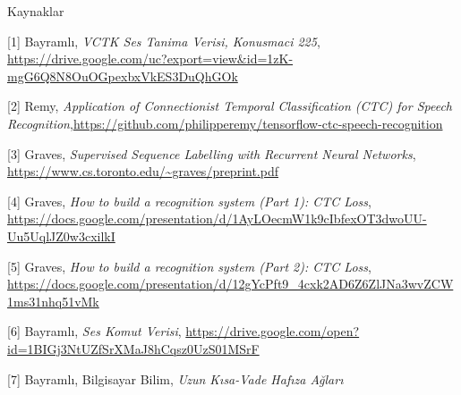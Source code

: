 \documentclass[12pt,fleqn]{article}\usepackage{../../common}
\begin{document}
\inputminted[fontsize=\footnotesize]{python}{train_ctc.py}

Kaynaklar

[1] Bayramlı, {\em VCTK Ses Tanima Verisi, Konusmaci 225}, \url{https://drive.google.com/uc?export=view&id=1zK-mgG6Q8N8OuOGpexbxVkES3DuQhGOk}

[2] Remy, {\em Application of Connectionist Temporal Classification (CTC) for Speech Recognition},\url{https://github.com/philipperemy/tensorflow-ctc-speech-recognition}

[3] Graves, {\em Supervised Sequence Labelling with Recurrent Neural Networks}, \url{https://www.cs.toronto.edu/~graves/preprint.pdf}

[4] Graves, {\em How to build a recognition system (Part 1): CTC Loss}, \url{https://docs.google.com/presentation/d/1AyLOecmW1k9cIbfexOT3dwoUU-Uu5UqlJZ0w3cxilkI}

[5] Graves, {\em How to build a recognition system (Part 2): CTC Loss}, \url{https://docs.google.com/presentation/d/12gYcPft9_4cxk2AD6Z6ZlJNa3wvZCW1ms31nhq51vMk}

[6] Bayramlı, {\em Ses Komut Verisi}, \url{https://drive.google.com/open?id=1BIGj3NtUZfSrXMaJ8hCqsz0UzS01MSrF}

[7] Bayramlı, Bilgisayar Bilim, {\em Uzun Kısa-Vade  Hafıza Ağları}
\end{document}
